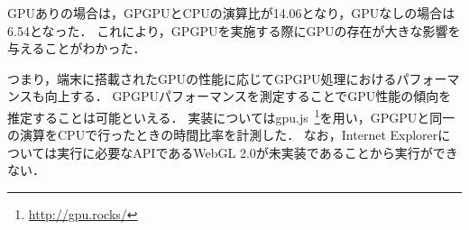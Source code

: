 GPUありの場合は，GPGPUとCPUの演算比が14.06となり，GPUなしの場合は6.54となった．
これにより，GPGPUを実施する際にGPUの存在が大きな影響を与えることがわかった．

つまり，端末に搭載されたGPUの性能に応じてGPGPU処理におけるパフォーマンスも向上する．
GPGPUパフォーマンスを測定することでGPU性能の傾向を推定することは可能といえる．
実装についてはgpu.js~\footnote{\url{http://gpu.rocks/}}を用い，GPGPUと同一の演算をCPUで行ったときの時間比率を計測した．
なお，Internet Explorerについては実行に必要なAPIであるWebGL 2.0が未実装であることから実行ができない．